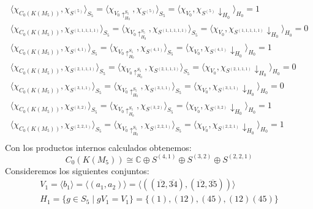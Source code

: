 \documentclass[12pt]{book}
\theoremstyle{definition}
\newcounter{in}
\begin{document}
\begin{eqnarray*}
  \langle\chi_{C_{0}(K(M_{5}))},\chi_{S^{(5)}}\rangle_{S_{5}}=\langle\chi_{V_{0}\uparrow^{S_{5}}_{H_0}},\chi_{S^{(5)}}\rangle_{S_{5}}=\langle\chi_{V_{0}},\chi_{S^{(5)}}\downarrow_{H_{0}}\rangle_{H_{0}}=1\\
 \langle\chi_{C_{0}(K(M_{5}))},\chi_{S^{(1,1,1,1,1)}}\rangle_{S_{5}}=\langle\chi_{V_{0}\uparrow^{S_{5}}_{H_0}},\chi_{S^{(1,1,1,1,1)}}\rangle_{S_{5}}=\langle\chi_{V_{0}},\chi_{S^{(1,1,1,1,1)}}\downarrow_{H_{0}}\rangle_{H_{0}}=0\\
\langle\chi_{C_{0}(K(M_{5}))},\chi_{S^{(4,1)}}\rangle_{S_{5}}=\langle\chi_{V_{0}\uparrow^{S_{5}}_{H_0}},\chi_{S^{(4,1)}}\rangle_{S_{5}}=\langle\chi_{V_{0}},\chi_{S^{(4,1)}}\downarrow_{H_{0}}\rangle_{H_{0}}=1\\
\langle\chi_{C_{0}(K(M_{5}))},\chi_{S^{(2,1,1,1)}}\rangle_{S_{5}}=\langle\chi_{V_{0}\uparrow^{S_{5}}_{H_0}},\chi_{S^{(2,1,1,1)}}\rangle_{S_{5}}=\langle\chi_{V_{0}},\chi_{S^{(2,1,1,1)}}\downarrow_{H_{0}}\rangle_{H_{0}}=0\\
\langle\chi_{C_{0}(K(M_{5}))},\chi_{S^{(3,1,1)}}\rangle_{S_{5}}=\langle\chi_{V_{0}\uparrow^{S_{5}}_{H_0}},\chi_{S^{(3,1,1)}}\rangle_{S_{5}}=\langle\chi_{V_{0}},\chi_{S^{(3,1,1)}}\downarrow_{H_{0}}\rangle_{H_{0}}=0\\
\langle\chi_{C_{0}(K(M_{5}))},\chi_{S^{(3,2)}}\rangle_{S_{5}}=\langle\chi_{V_{0}\uparrow^{S_{5}}_{H_0}},\chi_{S^{(3,2)}}\rangle_{S_{5}}=\langle\chi_{V_{0}},\chi_{S^{(3,2)}}\downarrow_{H_{0}}\rangle_{H_{0}}=1\\
\langle\chi_{C_{0}(K(M_{5}))},\chi_{S^{(2,2,1)}}\rangle_{S_{5}}=\langle\chi_{V_{0}\uparrow^{S_{5}}_{H_0}},\chi_{S^{(2,2,1)}}\rangle_{S_{5}}=\langle\chi_{V_{0}},\chi_{S^{(2,2,1)}}\downarrow_{H_{0}}\rangle_{H_{0}}=1\\
\end{eqnarray*}
Con los productos internos calculados obtenemos:
\begin{equation}
C_{0}(K(M_{5}))\cong \mathbb{C}\oplus S^{(4,1)}\oplus S^{(3,2)}\oplus
S^{(2,2,1)}
\label{C0-KM5}
\end{equation}
Consideremos los siguientes conjuntos:
\begin{eqnarray*}
V_{1}=\langle b_{1}\rangle=\langle (a_{1},a_{2})\rangle=\langle((\overline{12},\overline{34}),(\overline{12},\overline{35}))\rangle\\
H_{1}=\{g\in S_{5}\mid gV_{1}=V_{1}\}=\{(1),(12),(45),(12)(45)\}
\end{eqnarray*}
\end{document}
